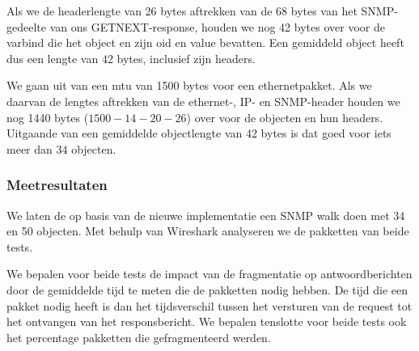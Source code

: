 Als we de headerlengte van 26 bytes aftrekken van de 68 bytes van het SNMP-gedeelte van ons GETNEXT-response, houden we nog 42 bytes over voor de varbind
die het object en zijn \gls{oid} en value bevatten.
Een gemiddeld object heeft dus een lengte van 42 bytes, inclusief zijn headers.

We gaan uit van een \gls{mtu} van 1500 bytes voor een ethernetpakket.
Als we daarvan de lengtes aftrekken van de ethernet-, IP- en SNMP-header houden we nog 1440 bytes ($1500 - 14 - 20 - 26$) over voor de objecten en hun headers.
Uitgaande van een gemiddelde objectlengte van 42 bytes is dat goed voor iets meer dan 34 objecten.

\subsubsection{Meetresultaten}

We laten de \nwmretriever{} op basis van de nieuwe implementatie een SNMP walk doen met 34 en 50 objecten.
Met behulp van Wireshark analyseren we de pakketten van beide tests.

We bepalen voor beide tests de impact van de fragmentatie op antwoordberichten door de gemiddelde tijd te meten die de pakketten nodig hebben.
De tijd die een pakket nodig heeft is dan het tijdsverschil tussen het versturen van de request tot het ontvangen van het responsbericht.
We bepalen tenslotte voor beide tests ook het percentage pakketten die gefragmenteerd werden.

